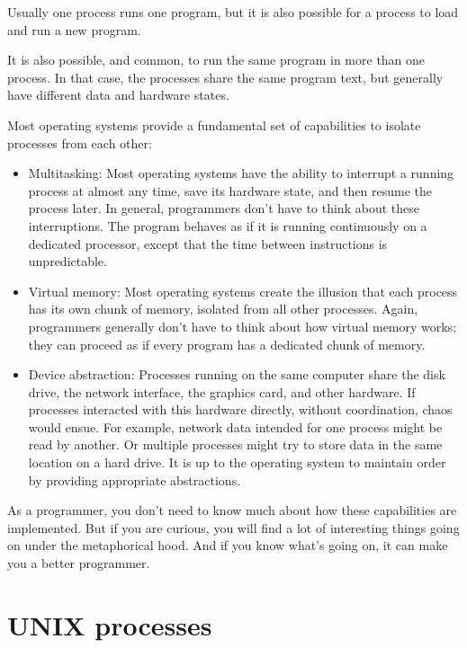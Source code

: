 \documentclass[12pt]{book}
\begin{document}
Usually one process runs one program, but it is also possible for
a process to load and run a new program.

It is also possible, and common, to run the same program in more than one
process.  In that case, the processes share the same program text,
but generally have different data and hardware states.

Most operating systems provide a fundamental set of capabilities
to isolate processes from each other:

\begin{itemize}

\item Multitasking: Most operating systems have the ability to
  interrupt a running process at almost any time, save its hardware
  state, and then resume the process later.  In general, programmers
  don't have to think about these interruptions.  The program behaves
  as if it is running continuously on a dedicated processor, 
  except that the time between instructions is unpredictable.

\item Virtual memory: Most operating systems create the
  illusion that each process has its own chunk of memory, isolated
  from all other processes.  Again, programmers generally don't
  have to think about how virtual memory works; they can proceed
  as if every program has a dedicated chunk of memory.

\item Device abstraction: Processes running on the same computer share
  the disk drive, the network interface, the graphics card, and other
  hardware.  If processes interacted with this hardware directly,
  without coordination, chaos would ensue.  For example, network data
  intended for one process might be read by another.  Or multiple
  processes might try to store data in the same location on a hard
  drive.  It is up to the operating system to maintain order by
  providing appropriate abstractions.

\end{itemize}

As a programmer, you don't need to know much about how these
capabilities are implemented.  But if you are
curious, you will find a lot of interesting things
going on under the metaphorical hood.  And if you know what's
going on, it can make you a better programmer.


\section{UNIX processes}
\label{unixps}
\end{document}
